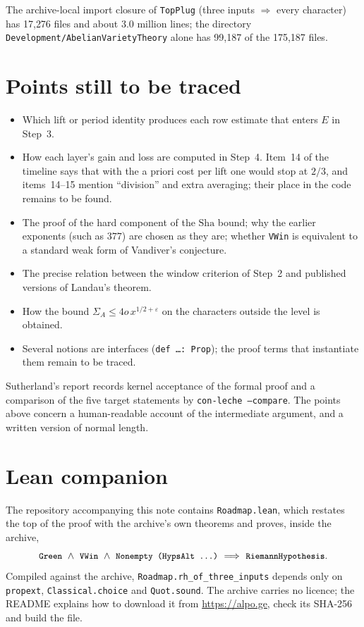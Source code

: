 \documentclass[11pt]{article}
\newcommand{\Lean}[1]{\texttt{\small #1}}
\newcommand{\Sha}{\mathrm{Sha}}
\begin{document}
\medskip
The archive-local import closure of \Lean{TopPlug} (three inputs $\Rightarrow$ every character) has 17{,}276 files and about 3.0 million lines; the directory \Lean{Development/AbelianVarietyTheory} alone has 99{,}187 of the 175{,}187 files.

\section{Points still to be traced}\label{sec:open}
\begin{itemize}
\item Which lift or period identity produces each row estimate that enters $E$ in Step~3.
\item How each layer's gain and loss are computed in Step~4. Item~14 of the timeline says that with the a priori cost per lift one would stop at $2/3$, and items~14--15 mention ``division'' and extra averaging; their place in the code remains to be found.
\item The proof of the hard component of the $\Sha$ bound; why the earlier exponents (such as $377$) are chosen as they are; whether \Lean{VWin} is equivalent to a standard weak form of Vandiver's conjecture.
\item The precise relation between the window criterion of Step~2 and published versions of Landau's theorem.
\item How the bound $\Sigma_A\le 4o\,x^{1/2+\varepsilon}$ on the characters outside the level is obtained.
\item Several notions are interfaces (\Lean{def \dots : Prop}); the proof terms that instantiate them remain to be traced.
\end{itemize}
Sutherland's report records kernel acceptance of the formal proof and a comparison of the five target statements by \Lean{con-leche --compare}. The points above concern a human-readable account of the intermediate argument, and a written version of normal length.

\section{Lean companion}
The repository accompanying this note contains \Lean{Roadmap.lean}, which restates the top of the proof with the archive's own theorems and proves, inside the archive,
\[
\Lean{Green}\ \wedge\ \Lean{VWin}\ \wedge\ \Lean{Nonempty (HypsAlt \dots)}\ \Longrightarrow\ \Lean{RiemannHypothesis}.
\]
Compiled against the archive, \Lean{Roadmap.rh\_of\_three\_inputs} depends only on \Lean{propext}, \Lean{Classical.choice} and \Lean{Quot.sound}. The archive carries no licence; the README explains how to download it from \url{https://alpo.ge}, check its SHA-256 and build the file.
\end{document}
